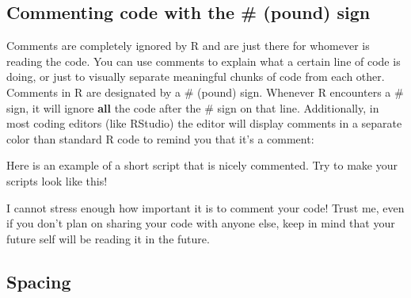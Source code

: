 \documentclass[]{book}
\newenvironment{Shaded}{\begin{snugshade}}{\end{snugshade}}
\newcommand{\KeywordTok}[1]{\textcolor[rgb]{0.13,0.29,0.53}{\textbf{{#1}}}}
\newcommand{\DataTypeTok}[1]{\textcolor[rgb]{0.13,0.29,0.53}{{#1}}}
\newcommand{\StringTok}[1]{\textcolor[rgb]{0.31,0.60,0.02}{{#1}}}
\newcommand{\CommentTok}[1]{\textcolor[rgb]{0.56,0.35,0.01}{\textit{{#1}}}}
\newcommand{\NormalTok}[1]{{#1}}
\theoremstyle{definition}
\theoremstyle{definition}
\theoremstyle{remark}
\begin{document}
\subsection{Commenting code with the \# (pound)
sign}\label{commenting-code-with-the-pound-sign}

Comments are completely ignored by R and are just there for whomever is
reading the code. You can use comments to explain what a certain line of
code is doing, or just to visually separate meaningful chunks of code
from each other. Comments in R are designated by a \# (pound) sign.
Whenever R encounters a \# sign, it will ignore \textbf{all} the code
after the \# sign on that line. Additionally, in most coding editors
(like RStudio) the editor will display comments in a separate color than
standard R code to remind you that it's a comment:

Here is an example of a short script that is nicely commented. Try to
make your scripts look like this!

\begin{Shaded}
\end{Shaded}

I cannot stress enough how important it is to comment your code! Trust
me, even if you don't plan on sharing your code with anyone else, keep
in mind that your future self will be reading it in the future.

\subsection{Spacing}\label{spacing}
\end{document}

